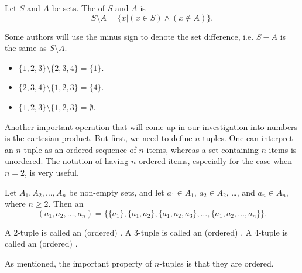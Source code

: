 \begin{definition}
    Let $S$ and $A$ be sets. The  of $S$ and $A$ is
    \[
        S \setminus A = \{x \vert (x \in S) \land (x \notin A)\}.
    \]
\end{definition}
\begin{remark}
    Some authors will use the minus sign to denote the set difference, i.e. $S - A$ is the same as $S \setminus A$.
\end{remark}

\begin{example}
    \begin{itemize}[leftmargin=*]
        \item $\{1, 2, 3\} \setminus \{2, 3, 4\} = \{1\}$.
        \item $\{2, 3, 4\} \setminus \{1, 2, 3\} = \{4\}$.
        \item $\{1, 2, 3\} \setminus \{1, 2, 3\} = \emptyset$.
    \end{itemize}
\end{example}

Another important operation that will come up in our investigation into numbers is the cartesian product. But first, we need to define $n$-tuples. One can interpret an $n$-tuple as an ordered sequence of $n$ items, whereas a set containing $n$ items is unordered. The notation of having $n$ ordered items, especially for the case when $n = 2$, is very useful.

\begin{definition}[$n$-tuples]
    Let $A_1, A_2, \dots, A_n$ be non-empty sets, and let $a_1 \in A_1$, $a_2 \in A_2$, \dots, and $a_n \in A_n$, where $n \geq 2$. Then an 
    \[
        (a_1, a_2, \dots, a_n) = \{\{a_1\}, \{a_1, a_2\}, \{a_1, a_2, a_3\}, \dots, \{a_1, a_2, \dots, a_n\}\}.
    \]
\end{definition}
\begin{remark}
    A 2-tuple is called an (ordered) . A 3-tuple is called an (ordered) . A 4-tuple is called an (ordered) .
\end{remark}

As mentioned, the important property of $n$-tuples is that they are ordered.

